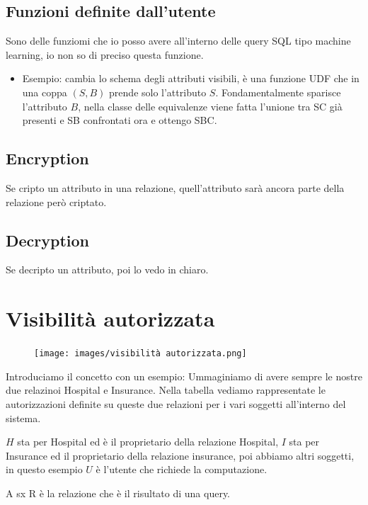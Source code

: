 \documentclass{report}
\begin{document}
\subsection{Funzioni definite dall'utente}
Sono delle funziomi che io posso avere all'interno delle query SQL tipo machine learning, io non so di preciso questa funzione.
\begin{itemize}
    \item Esempio: cambia lo schema degli attributi visibili, è una funzione UDF che in una coppa $(S,B)$ prende solo l'attributo $S$.
    Fondamentalmente sparisce l'attributo $B$, nella classe delle equivalenze viene fatta l'unione tra SC già presenti e SB confrontati ora e ottengo SBC.
\end{itemize}


\subsection{Encryption}
Se cripto un attributo in una relazione, quell'attributo sarà ancora parte della relazione però criptato.

\subsection{Decryption}
Se decripto un attributo, poi lo vedo in chiaro.

\section{Visibilità autorizzata}
\begin{figure}[H]
    \centering
    \texttt{[image: images/visibilità autorizzata.png]}
\end{figure}

Introduciamo il concetto con un esempio: Ummaginiamo di avere sempre le nostre due relazinoi Hospital e Insurance. Nella tabella vediamo rappresentate
le autorizzazioni definite su queste due relazioni per i vari soggetti all'interno del sistema.

\noindent $H$ sta per Hospital ed è il proprietario della relazione Hospital, $I$ sta per Insurance ed il proprietario della relazione insurance,
poi abbiamo altri soggetti, in questo esempio $U$ è l'utente che richiede la computazione.

\noindent A sx R è la relazione che è il risultato di una query.
\end{document}
